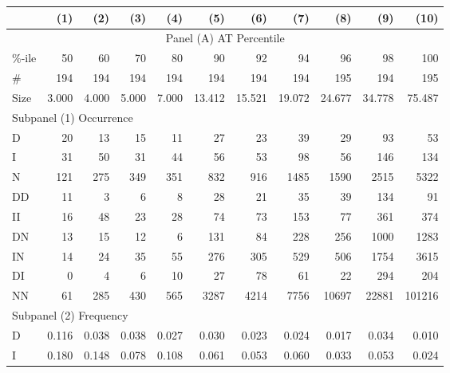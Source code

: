 \clearpage
{\footnotesize \begin{tabular}{lrrrrrrrrrr}
	\hline\hline
	       &   (1) &   (2) &   (3) &   (4) &    (5) &    (6) &    (7) &    (8) &    (9) &   (10) \\ \hline\hline
	                        \multicolumn{11}{c}{Panel (A) AT Percentile}                         \\ \hline\hline
	\%-ile &    50 &    60 &    70 &    80 &     90 &     92 &     94 &     96 &     98 &    100 \\
	\#     &   194 &   194 &   194 &   194 &    194 &    194 &    194 &    195 &    194 &    195 \\
	Size   & 3.000 & 4.000 & 5.000 & 7.000 & 13.412 & 15.521 & 19.072 & 24.677 & 34.778 & 75.487 \\ \hline
	\multicolumn{11}{l}{Subpanel (1) Occurrence}                                                 \\ \hline
	D      &    20 &    13 &    15 &    11 &     27 &     23 &     39 &     29 &     93 &     53 \\
	I      &    31 &    50 &    31 &    44 &     56 &     53 &     98 &     56 &    146 &    134 \\
	N      &   121 &   275 &   349 &   351 &    832 &    916 &   1485 &   1590 &   2515 &   5322 \\
	DD     &    11 &     3 &     6 &     8 &     28 &     21 &     35 &     39 &    134 &     91 \\
	II     &    16 &    48 &    23 &    28 &     74 &     73 &    153 &     77 &    361 &    374 \\
	DN     &    13 &    15 &    12 &     6 &    131 &     84 &    228 &    256 &   1000 &   1283 \\
	IN     &    14 &    24 &    35 &    55 &    276 &    305 &    529 &    506 &   1754 &   3615 \\
	DI     &     0 &     4 &     6 &    10 &     27 &     78 &     61 &     22 &    294 &    204 \\
	NN     &    61 &   285 &   430 &   565 &   3287 &   4214 &   7756 &  10697 &  22881 & 101216 \\ \hline
	\multicolumn{11}{l}{Subpanel (2) Frequency}                                                  \\ \hline
	D      & 0.116 & 0.038 & 0.038 & 0.027 &  0.030 &  0.023 &  0.024 &  0.017 &  0.034 &  0.010 \\
	I      & 0.180 & 0.148 & 0.078 & 0.108 &  0.061 &  0.053 &  0.060 &  0.033 &  0.053 &  0.024 \\

\end{tabular}}
